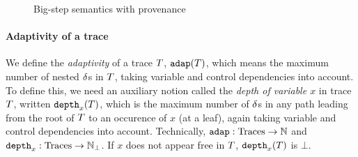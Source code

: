 \documentclass[a4paper,11pt]{article}
\theoremstyle{definition}
\begin{document}
\begin{figure}
  
  \caption{Big-step semantics with provenance}
  \label{fig:big-step}
\end{figure}


\paragraph{Adaptivity of a trace}
We define the \emph{adaptivity} of a trace $T$, $\mathtt{adap}(T)$, which
means the maximum number of nested $\delta$s in $T$, taking variable
and control dependencies into account. To define this, we need an
auxiliary notion called the \emph{depth of variable $x$} in trace
$T$, written $\mathtt{depth}_{x}(T)$, which is the maximum number of
$\delta{}$s in any path leading from the root of $T$ to an occurence
of $x$ (at a leaf), again taking variable and control dependencies
into account. Technically, $\mathtt{adap}: \mbox{Traces} \to \mathbb{N}$ and
$\mathtt{depth}_{x}: \mbox{Traces} \to \mathbb{N}_{\bot}$. If $x$ does not appear free in
$T$, $\mathtt{depth}_{x}(T)$ is $\bot$.
\end{document}
